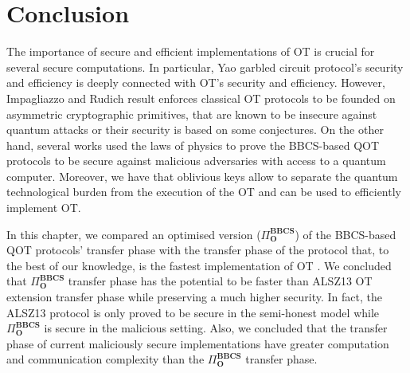 \section{Conclusion}

The importance of secure and efficient implementations of OT is crucial for several secure computations. In particular, Yao garbled circuit protocol's security and efficiency is deeply connected with OT's security and efficiency. However, Impagliazzo and Rudich result enforces classical OT protocols to be founded on asymmetric cryptographic primitives, that are known to be insecure against quantum attacks or their security is based on some conjectures. On the other hand, several works \cite{Lemus20,BCKM21, GLSV21,U10} used the laws of physics to prove the BBCS-based QOT protocols to be secure against malicious adversaries with access to a quantum computer. Moreover, we have that oblivious keys allow to separate the quantum technological burden from the execution of the OT and can be used to efficiently implement OT.

In this chapter, we compared an optimised version ($\Pi^{\textbf{BBCS}}_{\textbf{O}}$) of the BBCS-based QOT protocols' transfer phase with the transfer phase of the protocol that, to the best of our knowledge, is the fastest implementation of OT \cite{ALSZ13}. We concluded that $\Pi^{\textbf{BBCS}}_{\textbf{O}}$ transfer phase has the potential to be faster than ALSZ13 OT extension transfer phase while preserving a much higher security. In fact, the ALSZ13 protocol is only proved to be secure in the semi-honest model while $\Pi^{\textbf{BBCS}}_{\textbf{O}}$ is secure in the malicious setting. Also, we concluded that the transfer phase of current maliciously secure implementations \cite{ALSZ15, KOS15} have greater computation and communication complexity than the $\Pi^{\textbf{BBCS}}_{\textbf{O}}$ transfer phase.

%
%
%
